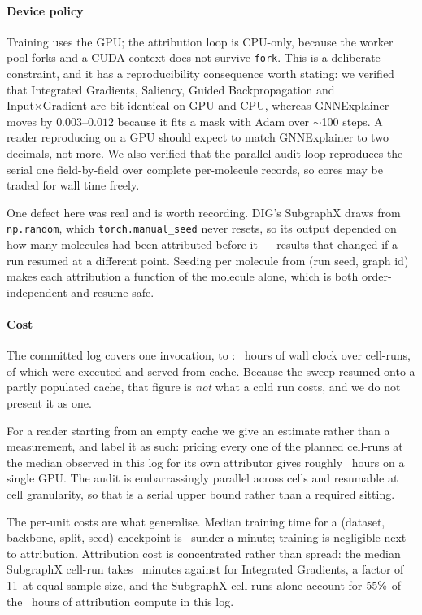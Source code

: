\paragraph{Device policy} Training uses the GPU; the attribution loop is
CPU-only, because the worker pool forks and a CUDA context does not survive
\texttt{fork}. This is a deliberate constraint, and it has a reproducibility
consequence worth stating: we verified that Integrated Gradients, Saliency,
Guided Backpropagation and Input×Gradient are bit-identical on GPU and CPU,
whereas GNNExplainer moves by $0.003$--$0.012$ because it fits a mask with Adam
over $\sim$100 steps. A reader reproducing on a GPU should expect to match
GNNExplainer to two decimals, not more. We also verified that the parallel
audit loop reproduces the serial one field-by-field over complete per-molecule
records, so cores may be traded for wall time freely.

One defect here was real and is worth recording. DIG's SubgraphX draws from
\texttt{np.random}, which \texttt{torch.manual\_seed} never resets, so its
output depended on how many molecules had been attributed before it --- results
that changed if a run resumed at a different point. Seeding per molecule from
(run seed, graph id) makes each attribution a function of the molecule alone,
which is both order-independent and resume-safe.

\paragraph{Cost} \ifHasCompute{}The committed log covers one invocation,
\computeStart{} to \computeEnd{}: \computeWallH{}~hours of wall clock over
\nComputeCellRuns{} cell-runs, of which \nComputeFresh{} were executed and
\nComputeCached{} served from cache. Because the sweep resumed onto a partly
populated cache, that figure is \emph{not} what a cold run costs, and we do not
present it as one.

For a reader starting from an empty cache we give an estimate rather than a
measurement, and label it as such:\ifHasColdEstimate{} pricing every one of the
\nComputeCellRuns{} planned cell-runs at the median observed in this log for
its own attributor gives roughly \computeColdEstH{}~hours on a single
GPU\fi{}. The audit is embarrassingly parallel across cells and resumable at
cell granularity, so that is a serial upper bound rather than a required
sitting.

The per-unit costs are what generalise. Median training time for a (dataset,
backbone, split, seed) checkpoint is
\ifHasTrainMedian\trainMedian{}~s\else under a minute\fi{}; training is
negligible next to attribution. Attribution cost is concentrated rather than
spread: the median SubgraphX cell-run takes
\cellSgxMin{}~minutes\ifHasCostRatio{} against \cellIgMin{} for Integrated
Gradients, a factor of $11{}$ at equal sample size\fi{}, and the
\nCellSgx{} SubgraphX cell-runs alone account for $55{}\%$ of the
\computeFreshH{}~hours of attribution compute in this log.

